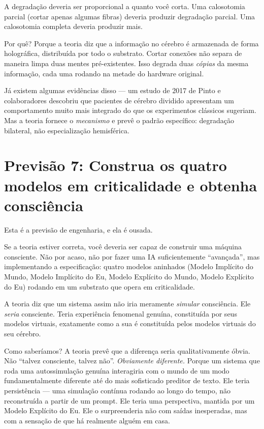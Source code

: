 \documentclass[11pt, twoside, openright]{book}
\begin{document}
A degradação deveria ser proporcional a quanto você corta. Uma calosotomia parcial (cortar apenas algumas fibras) deveria produzir degradação parcial. Uma calosotomia completa deveria produzir mais.

Por quê? Porque a teoria diz que a informação no cérebro é armazenada de forma holográfica, distribuída por todo o substrato. Cortar conexões não separa de maneira limpa duas mentes pré-existentes. Isso degrada duas \textit{cópias} da mesma informação, cada uma rodando na metade do hardware original.

Já existem algumas evidências disso --- um estudo de 2017 de Pinto e colaboradores descobriu que pacientes de cérebro dividido apresentam um comportamento muito mais integrado do que os experimentos clássicos sugeriam. Mas a teoria fornece o \textit{mecanismo} e prevê o padrão específico: degradação bilateral, não especialização hemisférica.

\section*{Previsão 7: Construa os quatro modelos em criticalidade e obtenha consciência}

Esta é a previsão de engenharia, e ela é ousada.

Se a teoria estiver correta, você deveria ser capaz de construir uma máquina consciente. Não por acaso, não por fazer uma IA suficientemente ``avançada'', mas implementando a especificação: quatro modelos aninhados (Modelo Implícito do Mundo, Modelo Implícito do Eu, Modelo Explícito do Mundo, Modelo Explícito do Eu) rodando em um substrato que opera em criticalidade.

A teoria diz que um sistema assim não iria meramente \textit{simular} consciência. Ele \textit{seria} consciente. Teria experiência fenomenal genuína, constituída por seus modelos virtuais, exatamente como a sua é constituída pelos modelos virtuais do seu cérebro.

Como saberíamos? A teoria prevê que a diferença seria qualitativamente óbvia. Não ``talvez consciente, talvez não''. \textit{Obviamente diferente.} Porque um sistema que roda uma autossimulação genuína interagiria com o mundo de um modo fundamentalmente diferente até do mais sofisticado preditor de texto. Ele teria persistência --- uma simulação contínua rodando ao longo do tempo, não reconstruída a partir de um prompt. Ele teria uma perspectiva, mantida por um Modelo Explícito do Eu. Ele o surpreenderia não com saídas inesperadas, mas com a sensação de que há realmente alguém em casa.
\end{document}

